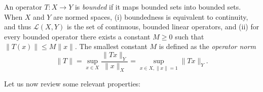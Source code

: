 \begin{definition}\label{def:bounded-operator}
    An operator $T:X\to Y$ is \emph{bounded} if it maps bounded sets into bounded sets. When $X$ and $Y$ are normed spaces, (i) boundedness is equivalent to continuity, and thus $\mathcal{L}(X,Y)$ is the set of continuous, bounded linear operators, and (ii) for every bounded operator there exists a constant $M\geq 0$ such that $\|T(x)\|\leq M\|x\|$. The smallest constant $M$ is defined as the \emph{operator norm}
    \begin{equation}\label{eq:operator-norm}
        \| T\| =  \sup_{x\in X}\frac{\|Tx\|_Y}{\|x\|_X} = \sup_{x\in X,\|x\|=1}\|Tx\|_Y.
    \end{equation}
\end{definition}
Let us now review some relevant properties: 
